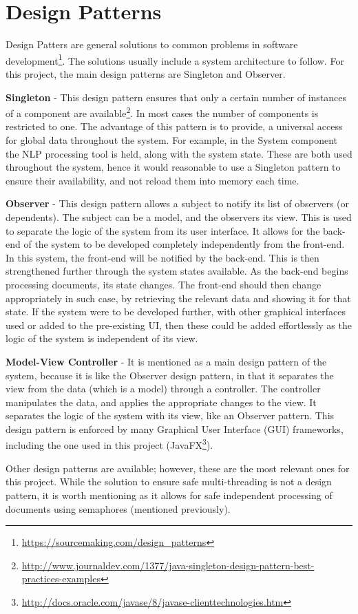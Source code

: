 \section{Design Patterns}
\par Design Patters are general solutions to common problems in software development\footnote{\url{https://sourcemaking.com/design_patterns}}. The solutions usually include a system architecture to follow. For this project, the main design patterns are Singleton and Observer.
\par \textbf{Singleton} - This design pattern ensures that only a certain number of instances of a component are available\footnote{\url{http://www.journaldev.com/1377/java-singleton-design-pattern-best-practices-examples}}. In most cases the number of components is restricted to one. The advantage of this pattern is to provide, a universal access for global data throughout the system. For example, in the System component the NLP processing tool is held, along with the system state. These are both used throughout the system, hence it would reasonable to use a Singleton pattern to ensure their availability, and not reload them into memory each time.
\par \textbf{Observer} - This design pattern allows a subject to notify its list of observers (or dependents). The subject can be a model, and the observers its view. This is used to separate the logic of the system from its user interface. It allows for the back-end of the system to be developed completely independently from the front-end. In this system, the front-end will be notified by the back-end. This is then strengthened further through the system states available. As the back-end begins processing documents, its state changes. The front-end should then change appropriately in such case, by retrieving the relevant data and showing it for that state. If the system were to be developed further, with other graphical interfaces used or added to the pre-existing UI, then these could be added effortlessly as the logic of the system is independent of its view.
\par \textbf{Model-View Controller} - It is mentioned as a main design pattern of the system, because it is like the Observer design pattern, in that it separates the view from the data (which is a model) through a controller. The controller manipulates the data, and applies the appropriate changes to the view. It separates the logic of the system with its view, like an Observer pattern. This design pattern is enforced by many Graphical User Interface (GUI) frameworks, including the one used in this project (JavaFX\footnote{\url{http://docs.oracle.com/javase/8/javase-clienttechnologies.htm}}). 
\par Other design patterns are available; however, these are the most relevant ones for this project. While the solution to ensure safe multi-threading is not a design pattern, it is worth mentioning as it allows for safe independent processing of documents using semaphores (mentioned previously). 


